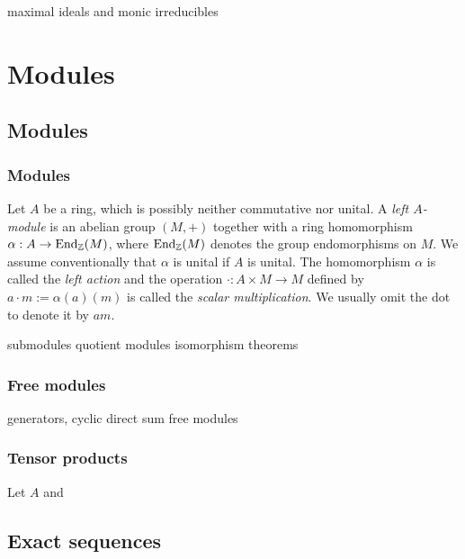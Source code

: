 \documentclass{../../large}
\begin{document}
maximal ideals and monic irreducibles






\part{Modules}



\chapter{Modules}
\section{Modules}

\begin{prb}
Let $A$ be a ring, which is possibly neither commutative nor unital.
A \emph{left $A$-module} is an abelian group $(M,+)$ together with a ring homomorphism $\alpha:A\to\operatorname{End}_{\mathbb{Z}}(M)$, where $\operatorname{End}_{\mathbb{Z}}(M)$ denotes the group endomorphisms on $M$.
We assume conventionally that $\alpha$ is unital if $A$ is unital.
The homomorphism $\alpha$ is called the \emph{left action} and the operation $\cdot:A\times M\to M$ defined by $a\cdot m:=\alpha(a)(m)$ is called the \emph{scalar multiplication}.
We usually omit the dot to denote it by $am$.
\begin{parts}
\item
\end{parts}
\end{prb}

submodules
quotient modules
isomorphism theorems



\section{Free modules}
generators, cyclic
direct sum
free modules

\section{Tensor products}


\begin{prb}
Let $A$ and

\end{prb}


\chapter{Exact sequences}
\end{document}
